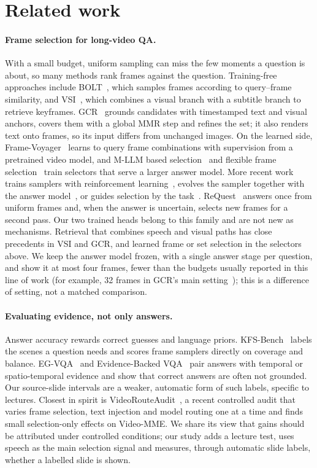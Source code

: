 \section{Related work}
\label{sec:related}

\paragraph{Frame selection for long-video QA.}
With a small budget, uniform sampling can miss the few moments a question is about, so many methods rank frames against the question.
Training-free approaches include BOLT~\cite{liu2025bolt}, which samples frames according to query--frame similarity, and VSI~\cite{he2025vsi}, which combines a visual branch with a subtitle branch to retrieve keyframes.
GCR~\cite{wei2026gcr} grounds candidates with timestamped text and visual anchors, covers them with a global MMR step and refines the set; it also renders text onto frames, so its input differs from unchanged images.
On the learned side, Frame-Voyager~\cite{yu2025framevoyager} learns to query frame combinations with supervision from a pretrained video model, and M-LLM based selection~\cite{hu2025mllm} and flexible frame selection~\cite{buch2025flexible} train selectors that serve a larger answer model.
More recent work trains samplers with reinforcement learning~\cite{qin2026efficient}, evolves the sampler together with the answer model~\cite{tan2026msjoe}, or guides selection by the task~\cite{bai2026hornet}.
ReQuest~\cite{kim2026request} answers once from uniform frames and, when the answer is uncertain, selects new frames for a second pass.
Our two trained heads belong to this family and are not new as mechanisms.
Retrieval that combines speech and visual paths has close precedents in VSI and GCR, and learned frame or set selection in the selectors above.
We keep the answer model frozen, with a single answer stage per question, and show it at most four frames, fewer than the budgets usually reported in this line of work (for example, 32 frames in GCR's main setting~\cite{wei2026gcr}); this is a difference of setting, not a matched comparison.

\paragraph{Evaluating evidence, not only answers.}
Answer accuracy rewards correct guesses and language priors.
KFS-Bench~\cite{li2025kfsbench} labels the scenes a question needs and scores frame samplers directly on coverage and balance.
EG-VQA~\cite{huang2026egvqa} and Evidence-Backed VQA~\cite{wang2026evidence} pair answers with temporal or spatio-temporal evidence and show that correct answers are often not grounded.
Our source-slide intervals are a weaker, automatic form of such labels, specific to lectures.
Closest in spirit is VideoRouteAudit~\cite{lin2026videorouteaudit}, a recent controlled audit that varies frame selection, text injection and model routing one at a time and finds small selection-only effects on Video-MME.
We share its view that gains should be attributed under controlled conditions; our study adds a lecture test, uses speech as the main selection signal and measures, through automatic slide labels, whether a labelled slide is shown.


